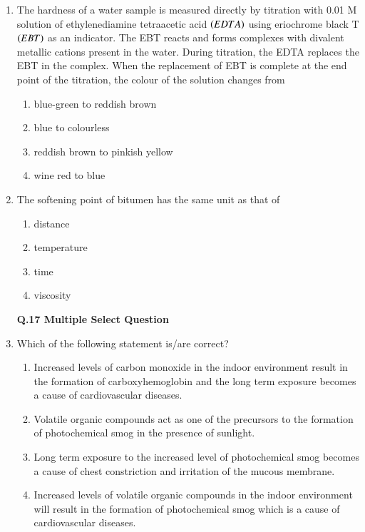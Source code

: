 \documentclass[journal,12pt,onecolumn]{article}
\theoremstyle{remark}
\begin{document}
\begin{enumerate}
\item The hardness of a water sample is measured directly by titration with 0.01 M solution of ethylenediamine tetraacetic acid $\left(EDTA\right)$ using eriochrome black T $\left(EBT\right)$ as an indicator. The EBT reacts and forms complexes with divalent metallic cations present in the water. During titration, the EDTA replaces the EBT in the complex. When the replacement of EBT is complete at the end point of the titration, the colour of the solution changes from

\hfill{}

\begin{enumerate}
    \item blue-green to reddish brown
    \item blue to colourless
    \item reddish brown to pinkish yellow
    \item wine red to blue
\end{enumerate}

\item The softening point of bitumen has the same unit as that of

\hfill{}

\begin{multicols}{2}
\begin{enumerate}
    \item distance
    \item temperature
    \item time
    \item viscosity
\end{enumerate}
\end{multicols}

\textbf{ Q.17 Multiple Select Question }
\item Which of the following statement is/are correct?

\hfill{}

\begin{enumerate}
    \item Increased levels of carbon monoxide in the indoor environment result in the formation of carboxyhemoglobin and the long term exposure becomes a cause of cardiovascular diseases.
    \item Volatile organic compounds act as one of the precursors to the formation of photochemical smog in the presence of sunlight.
    \item Long term exposure to the increased level of photochemical smog becomes a cause of chest constriction and irritation of the mucous membrane.
    \item Increased levels of volatile organic compounds in the indoor environment will result in the formation of photochemical smog which is a cause of cardiovascular diseases.
\end{enumerate}


\end{enumerate}
\end{document}
